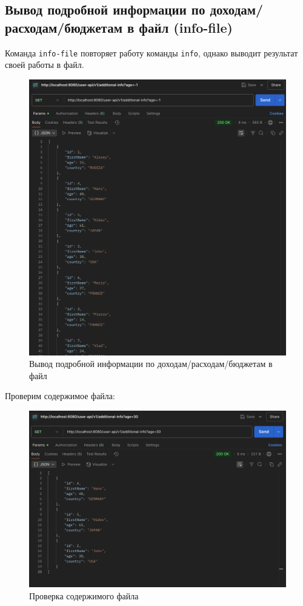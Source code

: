 \documentclass[a4paper, 14pt]{article}
\begin{document}
\subsection{Вывод подробной информации по доходам/расходам/бюджетам в файл (info-file)}

Команда \texttt{info-file} повторяет работу команды \texttt{info}, однако выводит результат своей работы в файл.

\begin{figure}[H]
	\centering
	\includegraphics[width=13cm]{resources/11.png}
	\caption{Вывод подробной информации по доходам/расходам/бюджетам в файл}
\end{figure}

Проверим содержимое файла:

\begin{figure}[H]
	\centering
	\includegraphics[width=13cm]{resources/12.png}
	\caption{Проверка содержимого файла}
\end{figure}
\end{document}
